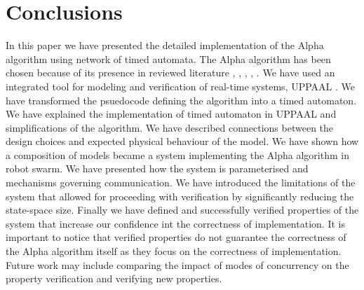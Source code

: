 \section{Conclusions}
In this paper we have presented the detailed implementation of the Alpha algorithm \cite{Minimalist_Coherent_Swarming_of_Wireless_Networked_Autonomous_Mobile_Robots} using network of timed automata. The Alpha algorithm has been chosen because of its presence in reviewed literature \cite{Towards_Temporal_Verification_of_Emergent_Behaviours_in_Swarm_Robotic_Systems}, \cite{On_Formal_Specification_of_Emergent_Behaviours_in_Swarm_Robotic_Systems}, \cite{Symmetry_Reduction_Enables_Model_Checking_of_More_Complex_Emergent_Behaviours_of_Swarm_Navigation_Algorithms}, \cite{A_Matrix_Based_Approach_For_Modeling_Robotic_Swarm_Behavior}, \cite{Verification_of_visibility-based_properties_on_multiple_moving_robots_in_an_environment_with_obstacles}. We have used an integrated tool for modeling and verification of real-time systems, UPPAAL \cite{UPPAAL_in_a_Nutshell}. We have transformed the psuedocode defining the algorithm into a timed automaton. We have explained the implementation of timed automaton in UPPAAL and simplifications of the algorithm. We have described connections between the design choices and expected physical behaviour of the model. We have shown how a composition of models became a system implementing the Alpha algorithm in robot swarm. We have presented how the system is parameterised and mechanisms governing communication. We have introduced the limitations of the system that allowed for proceeding with verification by significantly reducing the state-space size. Finally we have defined and successfully verified properties of the system that increase our confidence int the correctness of implementation. It is important to notice that verified properties do not guarantee the correctness of the Alpha algorithm itself as they focus on the correctness of implementation. Future work may include comparing the impact of modes of concurrency on the property verification and verifying new properties.

